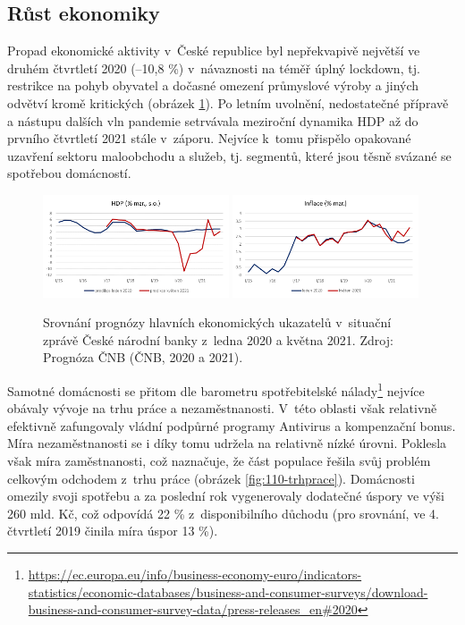 \subsection*{R\r{u}st ekonomiky} 
Propad ekonomické aktivity v~České republice byl nepřekvapivě největší ve druhém čtvrtletí 2020 (--10,8 \%) v~návaznosti na téměř úplný lockdown, tj. restrikce na pohyb obyvatel a dočasné omezení průmyslové výroby a jiných odvětví kromě kritických (obrázek \ref{fig:110-HDP}). Po letním uvolnění, nedostatečné přípravě a nástupu dalších vln pandemie setrvávala meziroční dynamika HDP až do prvního čtvrtletí 2021 stále v~záporu. Nejvíce k~tomu přispělo opakované uzavření sektoru maloobchodu a služeb, tj. segmentů, které jsou těsně svázané se spotřebou domácností. 
\begin{figure}[ht]
    \centering
    \includegraphics[width=0.49\textwidth]{./pic/HDP.png} \includegraphics[width=0.49\textwidth]{./pic/inflace.png}
    \caption{Srovnání prognózy hlavních ekonomických ukazatelů v~situační zprávě České národní banky z~ledna 2020 a května 2021. Zdroj: Prognóza ČNB (ČNB, 2020 a 2021).}
    \label{fig:110-HDP}
\end{figure} 
Samotné domácnosti se přitom dle barometru spotřebitelské nálady\footnote{\url{https://ec.europa.eu/info/business-economy-euro/indicators-statistics/economic-databases/business-and-consumer-surveys/download-business-and-consumer-survey-data/press-releases_en\#2020}} nejvíce obávaly vývoje na trhu práce a nezaměstnanosti. V~této oblasti však relativně efektivně zafungovaly vládní podpůrné programy Antivirus a kompenzační bonus. Míra nezaměstnanosti se i díky tomu udržela na relativně nízké úrovni. Poklesla však míra za\-měst\-na\-nos\-ti, což naznačuje, že část populace řešila svůj problém celkovým odchodem z~trhu práce (obrázek \ref{fig:110-trhprace}). Domácnosti omezily svoji spotřebu a za poslední rok vygenerovaly dodatečné úspory ve výši 260 mld. Kč, což odpovídá 22 \% z~disponibilního důchodu (pro srovnání, ve 4. čtvrtletí 2019 činila míra úspor 13 \%). 
